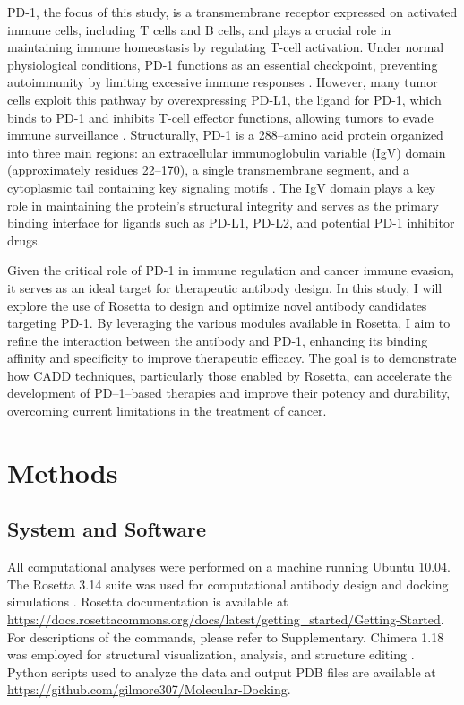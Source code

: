 \documentclass[11pt]{article}
\begin{document}
PD-1, the focus of this study, is a transmembrane receptor expressed on activated immune cells, including T cells and B cells, and plays a crucial role in maintaining immune homeostasis by regulating T-cell activation. Under normal physiological conditions, PD-1 functions as an essential checkpoint, preventing autoimmunity by limiting excessive immune responses \cite{Dong2002}. However, many tumor cells exploit this pathway by overexpressing PD-L1, the ligand for PD-1, which binds to PD-1 and inhibits T-cell effector functions, allowing tumors to evade immune surveillance \cite{Topalian2015}. Structurally, PD-1 is a 288–amino acid protein organized into three main regions: an extracellular immunoglobulin variable (IgV) domain (approximately residues 22–170), a single transmembrane segment, and a cytoplasmic tail containing key signaling motifs \cite{Tan2016,Chen2019}. The IgV domain plays a key role in maintaining the protein's structural integrity and serves as the primary binding interface for ligands such as PD-L1, PD-L2, and potential PD-1 inhibitor drugs.

Given the critical role of PD-1 in immune regulation and cancer immune evasion, it serves as an ideal target for therapeutic antibody design. In this study, I will explore the use of Rosetta to design and optimize novel antibody candidates targeting PD-1. By leveraging the various modules available in Rosetta, I aim to refine the interaction between the antibody and PD-1, enhancing its binding affinity and specificity to improve therapeutic efficacy. The goal is to demonstrate how CADD techniques, particularly those enabled by Rosetta, can accelerate the development of PD–1–based therapies and improve their potency and durability, overcoming current limitations in the treatment of cancer.

\section{Methods}

\subsection{System and Software}

All computational analyses were performed on a machine running Ubuntu 10.04. The Rosetta 3.14 suite was used for computational antibody design and docking simulations \cite{Leaver-Fay2011}. Rosetta documentation is available at \url{https://docs.rosettacommons.org/docs/latest/getting_started/Getting-Started}. For descriptions of the commands, please refer to Supplementary. Chimera 1.18 was employed for structural visualization, analysis, and structure editing \cite{pettersen2004}. Python scripts used to analyze the data and output PDB files are available at \url{https://github.com/gilmore307/Molecular-Docking}.
\end{document}

